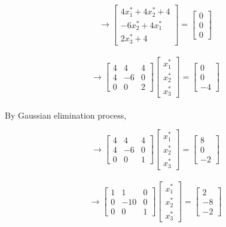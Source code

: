 \documentclass{article} %
\begin{document}
{    \[ \rightarrow \begin{bmatrix} 4x^*_1 + 4x^*_2 + 4 \\ -6x^*_2 + 4x^*_1 \\ 2x^*_3 + 4 \end{bmatrix} = \begin{bmatrix} 0 \\ 0 \\ 0 \end{bmatrix} \] \\
    
    \[ \rightarrow \begin{bmatrix}
        4 & 4 & 4 \\
        4 & -6 & 0 \\
        0 & 0 & 2
    \end{bmatrix} \begin{bmatrix}
        x^*_1 \\ x^*_2 \\ x^*_3
    \end{bmatrix} = \begin{bmatrix}
        0 \\ 0 \\ -4
    \end{bmatrix} \] \\

    By Gaussian elimination process,

    \[ \rightarrow \begin{bmatrix}
        4 & 4 & 4 \\
        4 & -6 & 0 \\
        0 & 0 & 1
    \end{bmatrix} \begin{bmatrix}
        x^*_1 \\ x^*_2 \\ x^*_3
    \end{bmatrix} = \begin{bmatrix}
        8 \\ 0 \\ -2
    \end{bmatrix} \] \\

    \[ \rightarrow \begin{bmatrix}
        1 & 1 & 0 \\
        0 & -10 & 0 \\
        0 & 0 & 1
    \end{bmatrix} \begin{bmatrix}
        x^*_1 \\ x^*_2 \\ x^*_3
    \end{bmatrix} = \begin{bmatrix}
        2 \\ -8 \\ -2
    \end{bmatrix} \] \\

}
\end{document}
